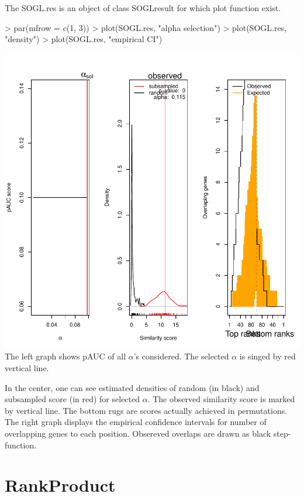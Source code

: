 \documentclass[a4paper]{report}
\begin{document}
The {\ttfamily SOGL.res} is an object of class {\ttfamily SOGLresult} for which plot function exist. 
\begin{Schunk}
\begin{Sinput}
> par(mfrow = c(1, 3))
> plot(SOGL.res, "alpha selection")
> plot(SOGL.res, "density")
> plot(SOGL.res, "empirical CI")
\end{Sinput}
\end{Schunk}
\includegraphics{MAMA_full-031}
The left graph shows pAUC of all $\alpha$'s considered. The selected $\alpha$ is singed by red vertical line. \par
In the center, one can see estimated densities of random (in black) and subsampled score (in red) for selected $\alpha$. The observed similarity score is marked by vertical line. The bottom rugs are scores actually achieved in permutations. 
The right graph displays the empirical confidence intervals for number of overlapping genes to each position. Obsereved overlaps are drawn as black step-function.




\chapter{RankProduct}
\end{document}
